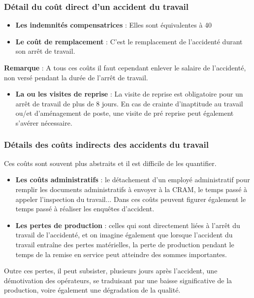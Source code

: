 \documentclass{beamer}
\begin{document}
\begin{frame}
\frametitle{Détail du coût direct d’un accident du travail}

\begin{itemize}
\item \textbf{Les indemnités compensatrices} : Elles sont équivalentes à 40 %

\item \textbf{Le coût de remplacement} : C’est le remplacement de l’accidenté durant son arrêt de travail.
\end{itemize}

\textbf{Remarque} : A tous ces coûts il faut cependant enlever le salaire de l’accidenté, non versé pendant la durée de l’arrêt de travail.

\begin{itemize}
\item \textbf{La ou les visites de reprise} : La visite de reprise est obligatoire pour un arrêt de travail de plus de 8 jours. En cas de crainte d’inaptitude au travail ou/et d’aménagement de poste, une visite de pré reprise peut également s’avérer nécessaire.
\end{itemize}
\end{frame}

\begin{frame}
\frametitle{Détails des coûts indirects des accidents du travail}

Ces coûts sont souvent plus abstraits et il est difficile de les quantifier.

\begin{itemize}
\item \textbf{Les coûts administratifs} : le détachement d’un employé administratif pour remplir les documents administratifs à envoyer à la CRAM, le temps passé à appeler l’inspection du travail... Dans ces coûts peuvent figurer également le temps passé à réaliser les enquêtes d’accident.

\item \textbf{Les pertes de production} : celles qui sont directement liées à l’arrêt du travail de l’accidenté, et on imagine également que lorsque l’accident du travail entraîne des pertes matérielles, la perte de production pendant le temps de la remise en service peut atteindre des sommes importantes.
\end{itemize}

Outre ces pertes, il peut subsister, plusieurs jours après l’accident, une démotivation des opérateurs, se traduisant par une baisse significative de la production, voire également une dégradation de la qualité.
\end{frame}
\end{document}
